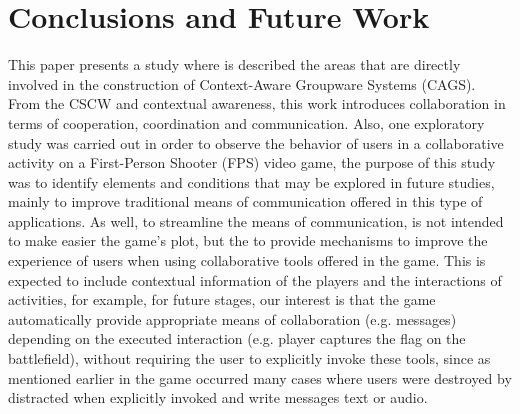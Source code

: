 \documentclass[conference]{./sty/IEEEtran}
\begin{document}
\section{Conclusions and Future Work}
\label{sec:conclusion}
This paper presents a study where is described the areas that are directly involved in the construction of Context-Aware Groupware Systems (CAGS). From the CSCW and contextual awareness, this work introduces collaboration in terms of cooperation, coordination and communication. Also, one exploratory study was carried out in order to observe the behavior of users in a collaborative activity on a First-Person Shooter (FPS) video game, the purpose of this study was to identify elements and conditions that may be explored in future studies, mainly to improve traditional means of communication offered in this type of applications. As well, to streamline the means of communication, is not intended to make easier the game's plot, but the to provide mechanisms to improve the experience of users when using collaborative tools offered in the game. This is expected to include contextual information of the players and the interactions of activities, for example, for future stages, our interest is that the game automatically provide appropriate means of collaboration (e.g. messages) depending on the executed interaction (e.g. player captures the flag on the battlefield), without requiring the user to explicitly invoke these tools, since as mentioned earlier in the game occurred many cases where users were destroyed by distracted when explicitly invoked and write messages text or audio.




\end{document}
